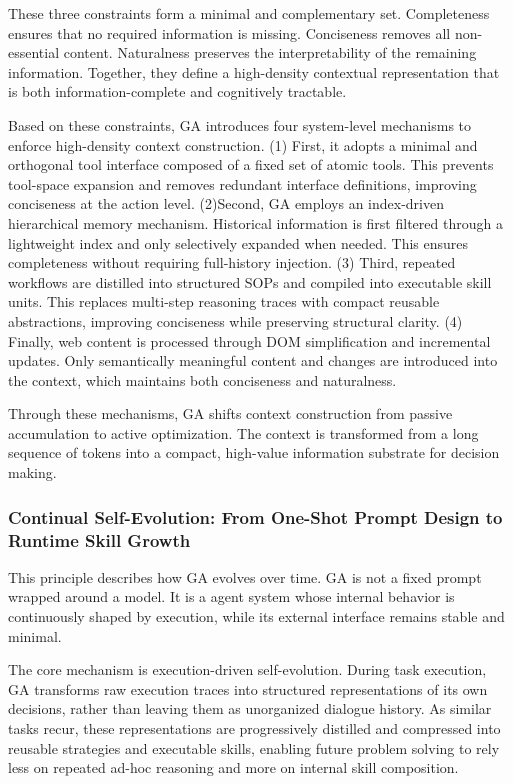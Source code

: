 These three constraints form a minimal and complementary set. Completeness ensures that no required information is missing. Conciseness removes all non-essential content. Naturalness preserves the interpretability of the remaining information. Together, they define a high-density contextual representation that is both information-complete and cognitively tractable.

Based on these constraints, GA introduces four system-level mechanisms to enforce high-density context construction. (1) First, it adopts a minimal and orthogonal tool interface composed of a fixed set of atomic tools. This prevents tool-space expansion and removes redundant interface definitions, improving conciseness at the action level. (2)Second, GA employs an index-driven hierarchical memory mechanism.  Historical information is first filtered through a lightweight index and only selectively expanded when needed. This ensures completeness without requiring full-history injection. (3) Third, repeated workflows are distilled into structured SOPs and compiled into executable skill units. This replaces multi-step reasoning traces with compact reusable abstractions, improving conciseness while preserving structural clarity. (4) Finally, web content is processed through DOM simplification and incremental updates. Only semantically meaningful content and changes are introduced into the context, which maintains both conciseness and naturalness. 

Through these mechanisms, GA shifts context construction from passive accumulation to active optimization. The context is transformed from a long sequence of tokens into a compact, high-value information substrate for decision making.

\subsubsection{Continual Self-Evolution: From One-Shot Prompt Design to Runtime Skill Growth}

This principle describes how GA evolves over time. GA is not a fixed prompt wrapped around a model. It is a agent system whose internal behavior is continuously shaped by execution, while its external interface remains stable and minimal.

The core mechanism is execution-driven self-evolution. During task execution, GA transforms raw execution traces into structured representations of its own decisions, rather than leaving them as unorganized dialogue history. As similar tasks recur, these representations are progressively distilled and compressed into reusable strategies and executable skills, enabling future problem solving to rely less on repeated ad-hoc reasoning and more on internal skill composition.

